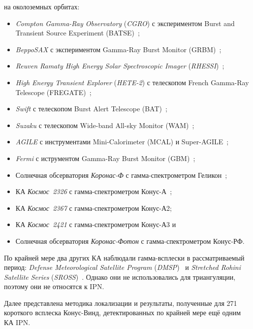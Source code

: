 на околоземных орбитах:
\begin{itemize}
\item \textit{Compton Gamma-Ray Observatory} (\textit{CGRO}) с экспериментом 
Burst and Transient Source Experiment (BATSE)~\citep{Fishman_1992NASCP3137};
\item \textit{BeppoSAX} с экспериментом Gamma-Ray Burst Monitor (GRBM)~\citep{Frontera_1997AAS,Feroci_1997SPIE};
\item \textit{Reuven Ramaty High Energy Solar Spectroscopic Imager} (\textit{RHESSI})~\citep{Lin_2002SoPh, Smith_2002SoPh};
\item \textit{High Energy Transient Explorer} (\textit{HETE-2}) с телескопом 
French Gamma-Ray Telescope (FREGATE)~\citep{Ricker_2003AIPC, Atteia_2003AIPC};
\item \textit{Swift} с телескопом Burst Alert Telescope (BAT)~\citep{Barthelmy_2005SSRv,Gehrels_2004ApJ};
\item \textit{Suzaku} с телескопом Wide-band All-sky Monitor (WAM)~\citep{Yamaoka_2009PASJ,Takahashi_2007PASJ};
\item \textit{AGILE} с инструментами Mini-Calorimeter (MCAL) и Super-AGILE~\citep{Tavani_2009AA};
\item \textit{Fermi} с иструментом Gamma-Ray Burst Monitor (GBM)~\citep{Meegan_2009ApJ};
\item Солнечная обсерватория \textit{Коронас-Ф} с гамма-спектрометром Геликон~\citep{Oraevskii_2002PhyU};
\item КА \textit{Космос~2326} с гамма-спектрометром Конус-А~\citep{Aptekar_1998ApJ};
\item КА \textit{Космос~2367} с гамма-спектрометром Конус-А2;
\item КА \textit{Космос~2421} с гамма-спектрометром Конус-А3 и
\item Солнечная обсерватория \textit{Коронас-Фотон} с гамма-спектрометром Конус-РФ.
\end{itemize}

По крайней мере два других КА наблюдали гамма-всплески в рассматриваемый период:
\textit{Defense Meteorological Satellite Program}
(\textit{DMSP})~\citep{Terrell_1998AIPC,Terrell_1996AIPC,Terrell_2004AIPC} и 
\textit{Stretched Rohini Satellite Series} (\textit{SROSS})~\citep{Marar_1994AA}.
Однако они не использовались для триангуляции, поэтому они не относятся к IPN. 

Далее представлена методика локализации и результаты, полученные для 271 короткого 
всплеска Конус-Винд, детектированных по крайней мере ещё одним КА IPN.

